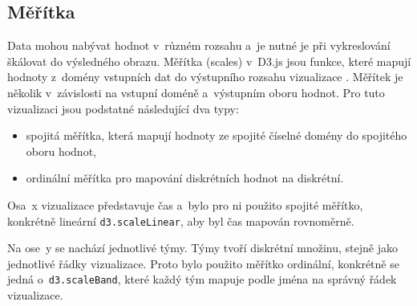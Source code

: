 \documentclass[
  digital, %
  oneside, %
  table,   %
  nolof,     %
  nolot,     %
]{fithesis3}
\begin{document}
\subsection{Měřítka}
Data mohou nabývat hodnot v~různém rozsahu a~je nutné je při vykreslování škálovat do výsledného obrazu. Měřítka (scales) v~D3.js jsou funkce, které mapují hodnoty z~domény vstupních dat do výstupního rozsahu vizualizace \cite{d3jsorg}. Měřítek je několik v~závislosti na vstupní doméně a~výstupním oboru hodnot. Pro tuto vizualizaci jsou podstatné následující dva typy:
\begin{itemize}
  \item spojitá měřítka, která mapují hodnoty ze spojité číselné domény do spojitého oboru hodnot,
  \item ordinální měřítka pro mapování diskrétních hodnot na diskrétní.
\end{itemize}
Osa~x vizualizace představuje čas a~bylo pro ni použito spojité měřítko, konkrétně lineární \verb|d3.scaleLinear|, aby byl čas mapován rovnoměrně.\par
Na ose~y se nachází jednotlivé týmy. Týmy tvoří diskrétní množinu, stejně jako jednotlivé řádky vizualizace. Proto bylo použito měřítko ordinální, konkrétně se jedná o~\verb|d3.scaleBand|, které každý tým mapuje podle jména na správný řádek vizualizace.

\end{document}
